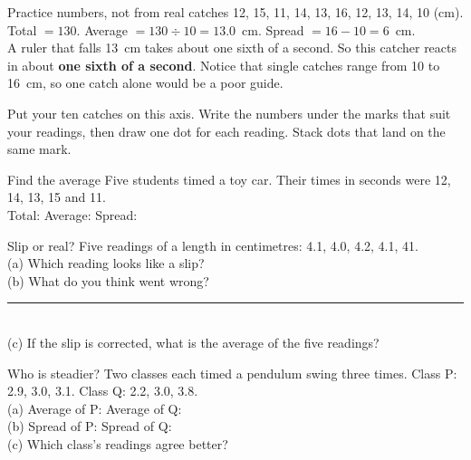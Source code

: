 \begin{worked}{Practice numbers, not from real catches}
12, 15, 11, 14, 13, 16, 12, 13, 14, 10 (cm).\\
Total $=130$. Average $=130\div10=13.0$~cm. Spread $=16-10=6$~cm.\\
A ruler that falls 13~cm takes about one sixth of a second. So this catcher reacts in about \textbf{one sixth of a second}. Notice that single catches range from 10 to 16~cm, so one catch alone would be a poor guide.
\end{worked}

Put your ten catches on this axis. Write the numbers under the marks that suit your readings, then draw one dot for each reading. Stack dots that land on the same mark.
\begin{center}
\end{center}

\clearpage

\begin{puzzle}{Find the average}
Five students timed a toy car. Their times in seconds were 12, 14, 13, 15 and 11.\\
Total: \wline[1.8cm] \quad Average: \wline[1.8cm] \quad Spread: \wline[1.8cm]
\end{puzzle}

\begin{puzzle}{Slip or real?}
Five readings of a length in centimetres: 4.1, 4.0, 4.2, 4.1, 41.\\
(a) Which reading looks like a slip? \wline[2cm]\\
(b) What do you think went wrong?\\\rule{\linewidth}{0.5pt}\\[2pt]
(c) If the slip is corrected, what is the average of the five readings? \wline[2cm]
\end{puzzle}

\begin{puzzle}{Who is steadier?}
Two classes each timed a pendulum swing three times. Class P: 2.9, 3.0, 3.1. Class Q: 2.2, 3.0, 3.8.\\
(a) Average of P: \wline[1.5cm] \quad Average of Q: \wline[1.5cm]\\
(b) Spread of P: \wline[1.5cm] \quad Spread of Q: \wline[1.5cm]\\
(c) Which class's readings agree better? \wline[2.5cm]
\end{puzzle}

